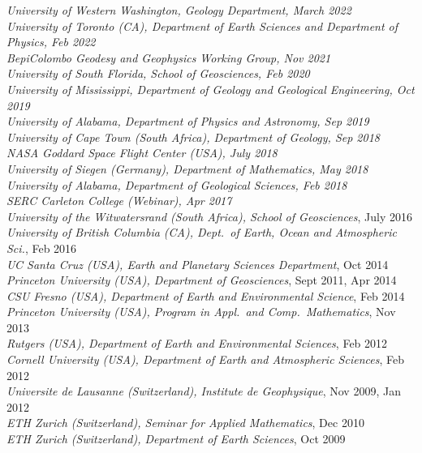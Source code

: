 \documentclass[10pt]{article}
\begin{document}
\spcp
\emph{University of Western Washington, Geology Department, March 2022}\\
\emph{University of Toronto (CA), Department of Earth Sciences and Department of Physics, Feb 2022}\\
\emph{BepiColombo Geodesy and Geophysics Working Group, Nov 2021}\\
\emph{University of South Florida, School of Geosciences, Feb 2020}\\
\emph{University of Mississippi, Department of Geology and Geological Engineering, Oct 2019}\\
\emph{University of Alabama, Department of Physics and Astronomy, Sep 2019}\\
\emph{University of Cape Town (South Africa), Department of Geology, Sep 2018}\\
\emph{NASA Goddard Space Flight Center (USA), July 2018}\\
\emph{University of Siegen (Germany), Department of Mathematics, May 2018}\\
\emph{University of Alabama, Department of Geological Sciences, Feb 2018}\\
\emph{SERC Carleton College (Webinar), Apr 2017}\\
\emph{University of the Witwatersrand (South Africa), School of Geosciences}, July 2016\\
\emph{University of British Columbia (CA), Dept.~of Earth, Ocean and Atmospheric Sci.}, Feb 2016\\
\emph{UC Santa Cruz (USA), Earth and Planetary Sciences Department}, Oct 2014\\
\emph{Princeton University (USA), Department of Geosciences}, Sept  2011, Apr 2014\\
\emph{CSU Fresno (USA), Department of Earth and Environmental Science}, Feb 2014\\
\emph{Princeton University (USA), Program in Appl.~and Comp.~Mathematics}, Nov 2013\\
\emph{Rutgers (USA), Department of Earth and Environmental Sciences}, Feb 2012\\
\emph{Cornell University (USA), Department of Earth and Atmospheric Sciences}, Feb 2012\\
\emph{Universite de Lausanne (Switzerland), Institute de Geophysique}, Nov 2009, Jan 2012\\
\emph{ETH Zurich (Switzerland), Seminar for Applied Mathematics}, Dec 2010\\
\emph{ETH Zurich (Switzerland), Department of Earth Sciences}, Oct 2009
\end{document}
